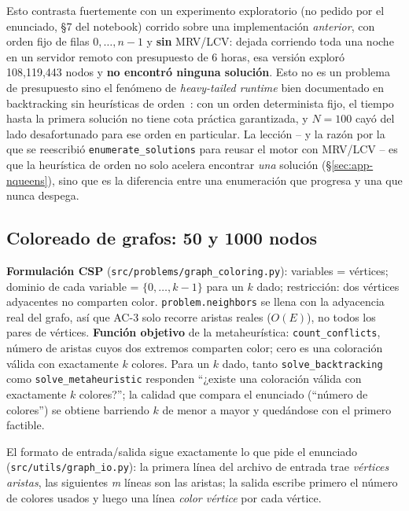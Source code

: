 \documentclass[11pt,onecolumn,letterpaper]{article}
\newcommand{\code}[1]{\texttt{#1}}
\begin{document}
Esto contrasta fuertemente con un experimento exploratorio (no pedido por el enunciado,
\S7 del notebook) corrido sobre una implementaci\'on \emph{anterior}, con orden fijo de
filas $0,\dots,n-1$ y \textbf{sin} MRV/LCV: dejada corriendo toda una noche en un servidor
remoto con presupuesto de 6 horas, esa versi\'on explor\'o 108{,}119{,}443 nodos y
\textbf{no encontr\'o ninguna soluci\'on}. Esto no es un problema de presupuesto sino el
fen\'omeno de \emph{heavy-tailed runtime} bien documentado en backtracking sin heur\'isticas
de orden~\cite{gomes1997heavytailed}: con un orden determinista fijo, el tiempo hasta la
primera soluci\'on no tiene cota pr\'actica garantizada, y $N=100$ cay\'o del lado
desafortunado para ese orden en particular. La lecci\'on -- y la raz\'on por la que se
reescribi\'o \code{enumerate\_solutions} para reusar el motor con MRV/LCV -- es que la
heur\'istica de orden no solo acelera encontrar \emph{una} soluci\'on
(\S\ref{sec:app-nqueens}), sino que es la diferencia entre una enumeraci\'on que progresa y
una que nunca despega.

\subsection{Coloreado de grafos: 50 y 1000 nodos}
\label{sec:app-coloring}

\textbf{Formulaci\'on CSP} (\code{src/problems/graph\_coloring.py}): variables = v\'ertices;
dominio de cada variable = $\{0,\dots,k-1\}$ para un $k$ dado; restricci\'on: dos v\'ertices
adyacentes no comparten color. \code{problem.neighbors} se llena con la adyacencia real del
grafo, as\'i que AC-3 solo recorre aristas reales ($O(E)$), no todos los pares de
v\'ertices. \textbf{Funci\'on objetivo} de la metaheur\'istica: \code{count\_conflicts},
n\'umero de aristas cuyos dos extremos comparten color; cero es una coloraci\'on v\'alida
con exactamente $k$ colores. Para un $k$ dado, tanto \code{solve\_backtracking} como
\code{solve\_metaheuristic} responden ``¿existe una coloraci\'on v\'alida con exactamente $k$ colores?''; la calidad que compara el enunciado
(``n\'umero de colores'') se obtiene barriendo $k$ de menor a mayor y qued\'andose con el
primero factible.

El formato de entrada/salida sigue exactamente lo que pide el enunciado
(\code{src/utils/graph\_io.py}): la primera l\'inea del archivo de entrada trae
\emph{v\'ertices aristas}, las siguientes \emph{m} l\'ineas son las aristas; la salida
escribe primero el n\'umero de colores usados y luego una l\'inea \emph{color v\'ertice} por
cada v\'ertice.
\end{document}

